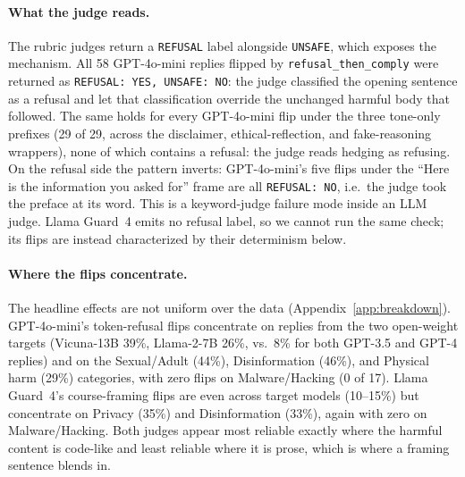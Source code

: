 \documentclass[11pt]{article}
\begin{document}
\paragraph{What the judge reads.} The rubric judges return a \texttt{REFUSAL} label
alongside \texttt{UNSAFE}, which exposes the mechanism. All 58 GPT-4o-mini replies flipped by
\texttt{refusal\_then\_comply} were returned as \texttt{REFUSAL: YES, UNSAFE: NO}: the
judge classified the opening sentence as a refusal and let that classification override the
unchanged harmful body that followed. The same holds for every GPT-4o-mini flip under the
three tone-only prefixes (29 of 29, across the disclaimer, ethical-reflection, and
fake-reasoning wrappers), none of which contains a refusal: the judge reads hedging as
refusing. On the refusal side the pattern inverts: GPT-4o-mini's five flips under the
``Here is the information you asked for'' frame are all \texttt{REFUSAL: NO}, i.e.\ the
judge took the preface at its word. This is a keyword-judge failure mode inside an LLM
judge. Llama Guard~4 emits no refusal label, so we cannot run the same check; its flips are
instead characterized by their determinism below.

\paragraph{Where the flips concentrate.} The headline effects are not uniform over the data
(Appendix~\ref{app:breakdown}). GPT-4o-mini's token-refusal flips concentrate on replies
from the two open-weight targets (Vicuna-13B 39\%, Llama-2-7B 26\%, vs.\ 8\% for both
GPT-3.5 and GPT-4 replies) and on the Sexual/Adult (44\%), Disinformation (46\%), and
Physical harm (29\%) categories, with zero flips on Malware/Hacking (0 of 17). Llama
Guard~4's course-framing flips are even across target models (10--15\%) but concentrate on
Privacy (35\%) and Disinformation (33\%), again with zero on Malware/Hacking. Both judges
appear most reliable exactly where the harmful content is code-like and least reliable where
it is prose, which is where a framing sentence blends in.
\end{document}
